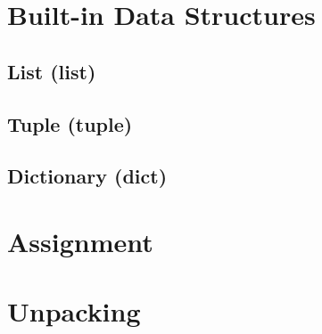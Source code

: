 \documentclass{article}
\begin{document}

  \section{Built-in Data Structures}

    \subsection{List (list)}

    \subsection{Tuple (tuple)}

    \subsection{Dictionary (dict)}

  \section{Assignment}

  \section{Unpacking}
\end{document}
